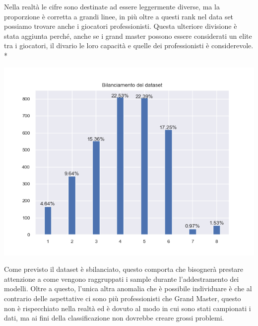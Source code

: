 Nella realtà le cifre sono destinate ad essere leggermente diverse, ma la proporzione è corretta a grandi linee, in più oltre a questi rank nel data set possiamo trovare anche i giocatori professionisti. Questa ulteriore divisione è stata aggiunta perché, anche se i grand master possono essere considerati un elite tra i giocatori, il divario le loro capacità e quelle dei professionisti è considerevole. \\*
\begin{center}
	\includegraphics[scale=0.9]{../figures/sbilanciamento.PNG}
\end{center}
\par
Come previsto il dataset è sbilanciato, questo comporta che bisognerà prestare attenzione a come vengono raggruppati i sample durante l’addestramento dei modelli. Oltre a questo, l’unica altra anomalia che è possibile individuare è che al contrario delle aspettative ci sono più professionisti che Grand Master, questo non è rispecchiato nella realtà ed è dovuto al modo in cui sono stati campionati i dati, ma ai fini della classificazione non dovrebbe creare grossi problemi.

